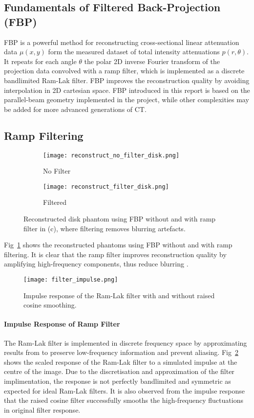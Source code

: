 \documentclass[10pt,twocolumn]{article}
\begin{document}
\subsection{Fundamentals of Filtered Back-Projection (FBP)}
FBP is a powerful method for reconstructing cross-sectional linear attenuation data $\mu(x,y)$ form the measured dataset of total intensity attenuations $p(r,\theta)$. 
It repeats for each angle $\theta$ the polar 2D inverse Fourier transform of the projection data convolved with a ramp filter, which is implemented as a discrete bandlimited Ram-Lak filter. FBP improves the reconstruction quality by avoiding interpolation in 2D cartesian space.
FBP introduced in this report is based on the parallel-beam geometry implemented in the project, while other complexities may be added for more advanced generations of CT.

\subsection{Ramp Filtering}
\begin{figure}[htbp]
    \centering
    \begin{subfigure}[b]{0.44\linewidth}
        \texttt{[image: reconstruct\_no\_filter\_disk.png]}
        \caption{No Filter}
    \end{subfigure}
    \begin{subfigure}[b]{0.44\linewidth}
        \texttt{[image: reconstruct\_filter\_disk.png]}
        \caption{Filtered}
    \end{subfigure}
    \caption{Reconstructed disk phantom using FBP without and with ramp filter in (c), where filtering removes blurring artefacts.}
    \label{fig:filter_reconstruction}
\end{figure}
Fig~\ref{fig:filter_reconstruction} shows the reconstructed phantoms using FBP without and with ramp filtering. It is clear that the ramp filter improves reconstruction quality by amplifying high-frequency components, thus reduce blurring \cite{Lyra_Ploussi_2011}.
\begin{figure}[htbp]
    \centering
    \texttt{[image: filter\_impulse.png]}
    \caption{Impulse response of the Ram-Lak filter with and without raised cosine smoothing.}
    \label{fig:filter_impulse}
\end{figure}

\paragraph{Impulse Response of Ramp Filter}
The Ram-Lak filter is implemented in discrete frequency space by approximating results from \cite{6940329} to preserve low-frequency information and prevent aliasing.
Fig~\ref{fig:filter_impulse} shows the scaled response of the Ram-Lak filter to a simulated impulse at the centre of the image. Due to the discretisation and approximation of the filter implimentation, the response is not perfectly bandlimited and symmetric as expected for ideal Ram-Lak filters.
It is also observed from the impulse response that the raised cosine filter successfully smooths the high-frequency fluctuations in original filter response.
\end{document}
